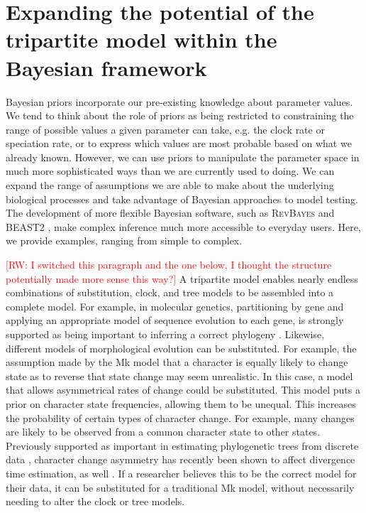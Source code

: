 \documentclass[11pt]{article}
\newcommand{\rw}[1]{{\textcolor{red}{[RW: #1]}}} %
\begin{document}
\section{Expanding the potential of the tripartite model within the Bayesian framework}

Bayesian priors incorporate our pre-existing knowledge about parameter values. %
We tend to think about the role of priors as being restricted to  constraining the range of possible values a given parameter can take, e.g. the clock rate or speciation rate, or to express which values are most probable based on what we already known.
However, we can use priors to manipulate the parameter space in much more sophisticated ways than we are currently used to doing.
We can expand the range of assumptions we are able to make about the underlying biological processes and take advantage of Bayesian approaches to model testing.
The development of more flexible Bayesian software, such as \textsc{RevBayes} \citep{Hoehna2014b, Hoehna2016b} and BEAST2 \citep{BEAST2}, make complex inference much more accessible to everyday users.
Here, we provide examples, ranging from simple to complex.

\rw{I switched this paragraph and the one below, I thought the structure potentially made more sense this way?} A tripartite model enables nearly endless combinations of substitution, clock, and tree models to be assembled into a complete model.
For example, in molecular genetics, partitioning by gene and applying an appropriate model of sequence evolution to each gene, is strongly supported as being important to inferring a correct phylogeny \cite{Brandley2005}.
Likewise, different models of morphological evolution can be substituted.
For example, the assumption made by the Mk model that a character is equally likely to change state as to reverse that state change may seem unrealistic. 
In this case, a model that allows asymmetrical rates of change \cite{Ronquist2004} could be substituted. 
 This model puts a prior on character state frequencies, allowing them to be unequal.
 This increases the probability of certain types of character change.
 For example, many changes are likely to be observed from a common character state to other states.
Previously supported as important in estimating phylogenetic trees from discrete data \cite{Wright2016}, character change asymmetry has recently been shown to affect divergence time estimation, as well \cite{Klopfstein2019}. 
If a researcher believes this to be the correct model for their data, it can be substituted for a traditional Mk model, without necessarily needing to alter the clock or tree models. 
\end{document}
